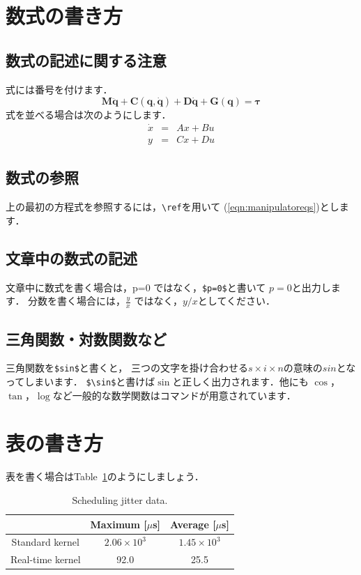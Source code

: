 \documentclass[twocolumn]{jsarticle}
\begin{document}
\section{数式の書き方}

\subsection{数式の記述に関する注意}
式には番号を付けます．
\begin{equation}
  \bm{M} \ddot{\bm{q}} + \bm{C}(\bm{q},\dot{\bm{q}}) 
  + \bm{D} \dot{\bm{q}} + \bm{G}(\bm{q}) = \bm{\tau}
  \label{eqn:manipulatoreqs}
\end{equation}
式を並べる場合は次のようにします．
\begin{eqnarray}
  \dot x & = & A x + B u \\
  y & = & C x + D u
\end{eqnarray}

\subsection{数式の参照}
上の最初の方程式を参照するには，\verb+\ref+を用いて
(\ref{eqn:manipulatoreqs})とします．

\subsection{文章中の数式の記述}
文章中に数式を書く場合は，p=0 ではなく，\verb+$p=0$+と書いて
$p=0$と出力します．
分数を書く場合には，$\frac{y}{x}$ ではなく，$y/x$としてください．

\subsection{三角関数・対数関数など}
三角関数を\verb+$sin$+と書くと，
三つの文字を掛け合わせる$s\times i\times n$の意味の$sin$となってしまいます．
\verb+$\sin$+と書けば$\sin$と正しく出力されます．他にも
$\cos$，$\tan$，$\log$など一般的な数学関数はコマンドが用意されています．


\section{表の書き方}
表を書く場合はTable~\ref{table:jitter}のようにしましょう．
\begin{table}[ht]
  \centering
  \caption{Scheduling jitter data.}
  \label{table:jitter}
  \begin{tabular}{|c|c|c|}\hline
    & Maximum [$\mu$s] & Average [$\mu$s] \\ \hline \hline
    Standard kernel & $2.06 \times 10^3$ & $1.45 \times 10^3$ \\ \hline
    Real-time kernel & 92.0 & 25.5 \\ \hline
  \end{tabular}
\end{table}
\end{document}
